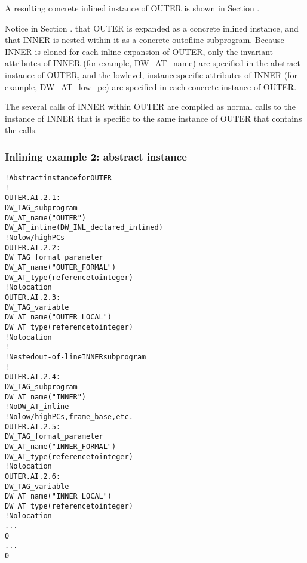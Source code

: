 A resulting concrete inlined instance of OUTER is shown in
Section .

Notice in 
Section .
that OUTER is expanded as a concrete
inlined instance, and that INNER is nested within it as a
concrete out\dash of\dash line subprogram. Because INNER is cloned
for each inline expansion of OUTER, only the invariant
attributes of INNER 
(for example, DW\_AT\_name) are specified
in the abstract instance of OUTER, and the low\dash level,
instance\dash specific attributes of INNER (for example,
DW\_AT\_low\_pc) are specified in each concrete instance of OUTER.

The several calls of INNER within OUTER are compiled as normal
calls to the instance of INNER that is specific to the same
instance of OUTER that contains the calls.


\subsubsection{Inlining example 2: abstract instance}
\label{app:inliningexample2abstractinstance}
\begin{alltt}
    ! Abstract instance for OUTER
    !
OUTER.AI.2.1:
    DW\_TAG\_subprogram
        DW\_AT\_name("OUTER")
        DW\_AT\_inline(DW\_INL\_declared\_inlined)
        ! No low/high PCs
OUTER.AI.2.2:
        DW\_TAG\_formal\_parameter
            DW\_AT\_name("OUTER\_FORMAL")
            DW\_AT\_type(reference to integer)
            ! No location
OUTER.AI.2.3:
        DW\_TAG\_variable
            DW\_AT\_name("OUTER\_LOCAL")
            DW\_AT\_type(reference to integer)
            ! No location
        !
        ! Nested out-of-line INNER subprogram
        !
OUTER.AI.2.4:
        DW\_TAG\_subprogram
            DW\_AT\_name("INNER")
            ! No DW\_AT\_inline
            ! No low/high PCs, frame\_base, etc.
OUTER.AI.2.5:
            DW\_TAG\_formal\_parameter
                DW\_AT\_name("INNER\_FORMAL")
                DW\_AT\_type(reference to integer)
                ! No location
OUTER.AI.2.6:
            DW\_TAG\_variable
                DW\_AT\_name("INNER\_LOCAL")
                DW\_AT\_type(reference to integer)
                ! No location
            ...
            0
        ...
        0
\end{alltt}

